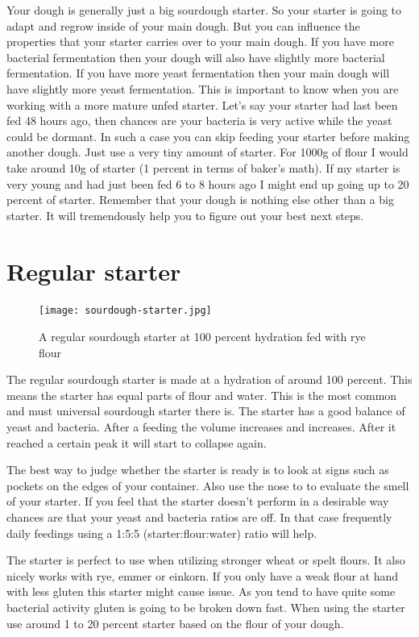 Your dough is generally just a big sourdough starter. So your starter is going
to adapt and regrow inside of your main dough. But you can influence the
properties that your starter carries over to your main dough. If you have more
bacterial fermentation then your dough will also have slightly more bacterial
fermentation. If you have more yeast fermentation then your main dough will
have slightly more yeast fermentation. This is important to know when you are
working with a more mature unfed starter. Let's say your starter had last been
fed 48 hours ago, then chances are your bacteria is very active while the
yeast could be dormant. In such a case you can skip feeding your starter
before making another dough. Just use a very tiny amount of starter. For 1000g
of flour I would take around 10g of starter (1 percent in terms of baker's
math). If my starter is very young and had just been fed 6 to 8 hours ago I might
end up going up to 20 percent of starter. Remember that your dough is nothing
else other than a big starter. It will tremendously help you to figure out
your best next steps.

\section{Regular starter}

\begin{figure}[!htb]
  \texttt{[image: sourdough-starter.jpg]}
  \caption{A regular sourdough starter at 100 percent hydration fed with rye flour}
  \label{fig:regular-sourdough-starter}
\end{figure}

The regular sourdough starter is made at a hydration of around 100 percent.
This means the starter has equal parts of flour and water. This is the most
common and must universal sourdough starter there is. The starter has a good
balance of yeast and bacteria. After a feeding the volume increases and
increases. After it reached a certain peak it will start to collapse again.

The best way to judge whether the starter is ready is to look at signs such as
pockets on the edges of your container. Also use the nose to to evaluate the
smell of your starter. If you feel that the starter doesn't perform in a
desirable way chances are that your yeast and bacteria ratios are off. In that
case frequently daily feedings using a 1:5:5 (starter:flour:water) ratio will
help.

The starter is perfect to use when utilizing stronger wheat or spelt flours.
It also nicely works with rye, emmer or einkorn. If you only have a weak flour
at hand with less gluten this starter might cause issue. As you tend to have
quite some bacterial activity gluten is going to be broken down fast. When
using the starter use around 1 to 20 percent starter based on the flour of your
dough.

